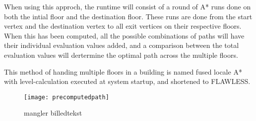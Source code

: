 When using this approch, the runtime will consist of a round of A* runs done on both the intial floor and the destination floor. These runs are done from the start vertex and the destination vertex to all exit vertices on their respective floors. When this has been computed, all the possible combinations of paths will have their individual evaluation values added, and a comparison between the total evaluation values will dertermine the optimal path across the multiple floors. 

This method of handing multiple floors in a building is named fused locale A* with level-calculation executed at system startup, and shortened to FLAWLESS. 


\begin{figure}[ht!]
    \centering
    \texttt{[image: precomputedpath]}
    \caption{mangler billedtekst}
    \label{fig:precomp}
  \end{figure}






